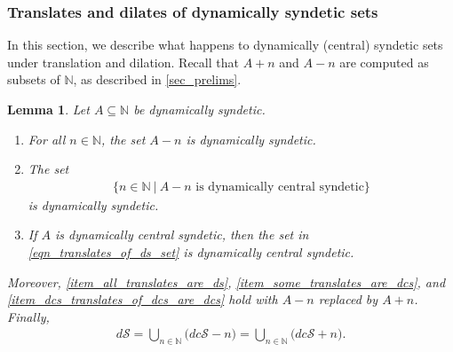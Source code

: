\documentclass[letter,11pt]{article}
\theoremstyle{plain}
\newtheorem{lemma}[theorem]{Lemma}
\theoremstyle{definition}
\theoremstyle{plain}
\theoremstyle{plain}
\numberwithin{equation}{section}
\newcommand{\N}{\mathbb{N}}
\newcommand{\dsyndetic}{d\mathcal{S}}
\newcommand{\dcsyndetic}{dc\mathcal{S}}
\begin{document}
\subsubsection{Translates and dilates of dynamically syndetic sets}

In this section, we describe what happens to dynamically (central) syndetic sets under translation and dilation.  Recall that $A + n$ and $A-n$ are computed as subsets of $\N$, as described in \cref{sec_prelims}.


\begin{lemma}
\label{lemma_translates_of_dsyndetic_sets}
    Let $A \subseteq \N$ be dynamically syndetic.
    \begin{enumerate}
        \item
        \label{item_all_translates_are_ds}
        For all $n \in \N$, the set $A-n$ is dynamically syndetic.
        
        \item
        \label{item_some_translates_are_dcs}
        The set
        \begin{align}
            \label{eqn_translates_of_ds_set}
            \big\{ n \in \N \ \big| \ A-n \text{ is dynamically central syndetic} \big\}
        \end{align}
        is dynamically syndetic.
        
        \item
        \label{item_dcs_translates_of_dcs_are_dcs}
        If $A$ is dynamically central syndetic, then the set in \eqref{eqn_translates_of_ds_set} is dynamically central syndetic.
    \end{enumerate}
    Moreover, \eqref{item_all_translates_are_ds}, \eqref{item_some_translates_are_dcs}, and \eqref{item_dcs_translates_of_dcs_are_dcs} hold with $A-n$ replaced by $A+n$. Finally,
    \begin{align}
        \label{eqn_relationship_between_ds_and_dcs_classes}
        \dsyndetic = \bigcup_{n \in \N} \big(\dcsyndetic - n \big) = \bigcup_{n \in \N} \big(\dcsyndetic + n \big).
    \end{align}
\end{lemma}
\end{document}
